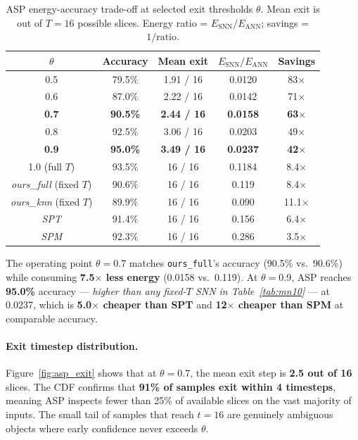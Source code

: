 \documentclass[11pt,a4paper]{article}
\begin{document}
\begin{table}[H]
  \centering
  \caption{ASP energy-accuracy trade-off at selected exit thresholds $\theta$.
           Mean exit is out of $T=16$ possible slices.
           Energy ratio = $E_\text{SNN}/E_\text{ANN}$; savings = $1/\text{ratio}$.}
  \label{tab:asp_pareto}
  \begin{tabular}{ccccc}
    \toprule
    $\theta$ & \textbf{Accuracy} & \textbf{Mean exit} & $E_\text{SNN}/E_\text{ANN}$ & \textbf{Savings} \\
    \midrule
    0.5 & 79.5\% & 1.91 / 16 & 0.0120 & 83$\times$ \\
    0.6 & 87.0\% & 2.22 / 16 & 0.0142 & 71$\times$ \\
    \textbf{0.7} & \textbf{90.5\%} & \textbf{2.44 / 16} & \textbf{0.0158} & \textbf{63}$\boldsymbol{\times}$ \\
    0.8 & 92.5\% & 3.06 / 16 & 0.0203 & 49$\times$ \\
    \textbf{0.9} & \textbf{95.0\%} & \textbf{3.49 / 16} & \textbf{0.0237} & \textbf{42}$\boldsymbol{\times}$ \\
    1.0 (full $T$) & 93.5\% & 16 / 16 & 0.1184 & 8.4$\times$ \\
    \midrule
    \textit{ours\_full} (fixed $T$) & 90.6\% & 16 / 16 & 0.119 & 8.4$\times$ \\
    \textit{ours\_knn} (fixed $T$) & 89.9\% & 16 / 16 & 0.090 & 11.1$\times$ \\
    \textit{SPT} & 91.4\% & 16 / 16 & 0.156 & 6.4$\times$ \\
    \textit{SPM} & 92.3\% & 16 / 16 & 0.286 & 3.5$\times$ \\
    \bottomrule
  \end{tabular}
\end{table}

The operating point $\theta = 0.7$ matches \texttt{ours\_full}'s accuracy
(90.5\% vs.\ 90.6\%) while consuming \textbf{7.5$\times$ less energy}
(0.0158 vs.\ 0.119). At $\theta = 0.9$, ASP reaches \textbf{95.0\%} accuracy
--- \emph{higher than any fixed-$T$ SNN in Table~\ref{tab:mn10}} ---
at 0.0237, which is \textbf{5.0$\times$ cheaper than SPT} and
\textbf{12$\times$ cheaper than SPM} at comparable accuracy.

\paragraph{Exit timestep distribution.}
Figure~\ref{fig:asp_exit} shows that at $\theta=0.7$, the mean exit step is
\textbf{2.5 out of 16} slices. The CDF confirms that \textbf{91\% of samples
exit within 4 timesteps}, meaning ASP inspects fewer than 25\% of available
slices on the vast majority of inputs. The small tail of samples that reach
$t=16$ are genuinely ambiguous objects where early confidence never exceeds
$\theta$.
\end{document}

